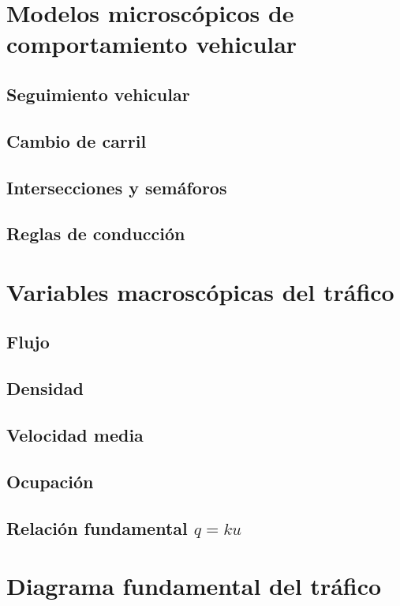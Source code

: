 \section{Modelos microscópicos de comportamiento vehicular}

\subsection{Seguimiento vehicular}

\subsection{Cambio de carril}

\subsection{Intersecciones y semáforos}

\subsection{Reglas de conducción}

\section{Variables macroscópicas del tráfico}

\subsection{Flujo}

\subsection{Densidad}

\subsection{Velocidad media}

\subsection{Ocupación}

\subsection{Relación fundamental $q = ku$}

\section{Diagrama fundamental del tráfico}

